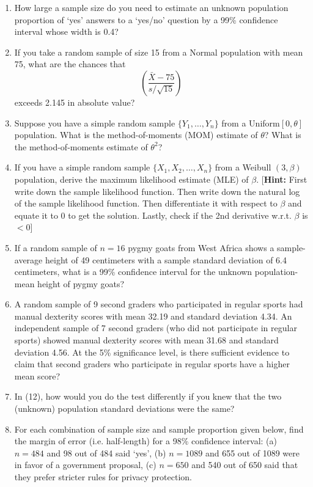 \documentclass[11pt]{article}
\begin{document}
\begin{enumerate}[label=(\arabic*), leftmargin=*, itemsep=1.15em]
\item How large a sample size do you need to estimate an unknown population proportion of `yes' answers to a `yes/no' question by a 99\% confidence interval whose width is 0.4?

\item If you take a random sample of size 15 from a Normal population with mean 75, what are the chances that
\[
    \left(\frac{\bar{X}-75}{s/\sqrt{15}}\right)
\]
exceeds 2.145 in absolute value?

\item Suppose you have a simple random sample $\{Y_1,\ldots,Y_n\}$ from a Uniform$[0,\theta]$ population. What is the method-of-moments (MOM) estimate of $\theta$? What is the method-of-moments estimate of $\theta^2$?

\item If you have a simple random sample $\{X_1,X_2,\ldots,X_n\}$ from a Weibull $(3,\beta)$ population, derive the maximum likelihood estimate (MLE) of $\beta$. [\textbf{Hint:} First write down the sample likelihood function. Then write down the natural log of the sample likelihood function. Then differentiate it with respect to $\beta$ and equate it to 0 to get the solution. Lastly, check if the 2nd derivative w.r.t. $\beta$ is $<0$]

\item If a random sample of $n=16$ pygmy goats from West Africa shows a sample-average height of 49 centimeters with a sample standard deviation of 6.4 centimeters, what is a 99\% confidence interval for the unknown population-mean height of pygmy goats?

\item A random sample of 9 second graders who participated in regular sports had manual dexterity scores with mean 32.19 and standard deviation 4.34. An independent sample of 7 second graders (who did not participate in regular sports) showed manual dexterity scores with mean 31.68 and standard deviation 4.56. At the 5\% significance level, is there sufficient evidence to claim that second graders who participate in regular sports have a higher mean score?

\item In (12), how would you do the test differently if you knew that the two (unknown) population standard deviations were the same?

\item For each combination of sample size and sample proportion given below, find the margin of error (i.e. half-length) for a 98\% confidence interval: (a) $n=484$ and 98 out of 484 said `yes', (b) $n=1089$ and 655 out of 1089 were in favor of a government proposal, (c) $n=650$ and 540 out of 650 said that they prefer stricter rules for privacy protection.


\end{enumerate}
\end{document}
